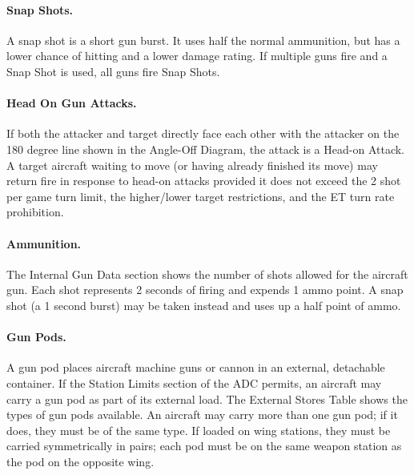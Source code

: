 

\paragraph{Snap Shots.} A snap shot is a short gun burst. It uses half the normal ammunition, but has a lower chance of hitting and a lower damage rating. If multiple guns fire and a Snap Shot is used, all guns fire Snap Shots.

\paragraph{Head On Gun Attacks.} If both the attacker and target directly face each other with the attacker on the 180 degree line shown in the Angle-Off Diagram, the attack is a Head-on Attack. A target aircraft waiting to move (or having already finished its move) may return fire in response to head-on attacks provided it does not exceed the 2 shot per game turn limit, the higher/lower target restrictions, and the ET turn rate prohibition. 

\paragraph{Ammunition.} The Internal Gun Data section shows the number of shots allowed for the aircraft gun. Each shot represents 2 seconds of firing and expends 1 ammo point. A snap shot (a 1 second burst) may be taken instead and uses up a half point of ammo.

\paragraph{Gun Pods.} A gun pod places aircraft machine guns or cannon in an external, detachable container. If the Station Limits section of the ADC permits, an aircraft may carry a gun pod as part of its external load. The External Stores Table shows the types of gun pods available. An aircraft may carry more than one gun pod; if it does, they must be of the same type. If loaded on wing stations, they must be carried symmetrically in pairs; each pod must be on the same weapon station as the pod on the opposite wing.

